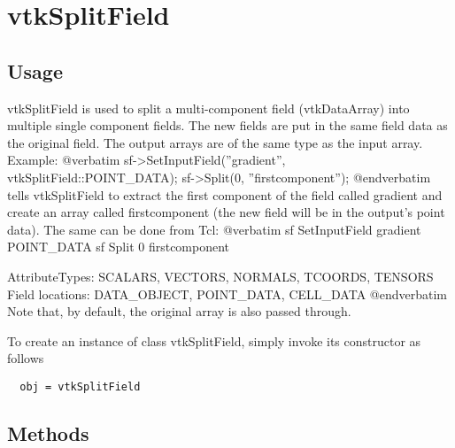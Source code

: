 \section{vtkSplitField}

\subsection{Usage}

 vtkSplitField is used to split a multi-component field (vtkDataArray)
 into multiple single component fields. The new fields are put in
 the same field data as the original field. The output arrays
 are of the same type as the input array. Example:
 @verbatim
 sf->SetInputField(''gradient'', vtkSplitField::POINT\_DATA);
 sf->Split(0, ''firstcomponent'');
 @endverbatim
 tells vtkSplitField to extract the first component of the field
 called gradient and create an array called firstcomponent (the
 new field will be in the output's point data).
 The same can be done from Tcl:
 @verbatim
 sf SetInputField gradient POINT\_DATA
 sf Split 0 firstcomponent

 AttributeTypes: SCALARS, VECTORS, NORMALS, TCOORDS, TENSORS
 Field locations: DATA\_OBJECT, POINT\_DATA, CELL\_DATA
 @endverbatim
 Note that, by default, the original array is also passed through.

To create an instance of class vtkSplitField, simply
invoke its constructor as follows
\begin{verbatim}
  obj = vtkSplitField
\end{verbatim}
\subsection{Methods}

